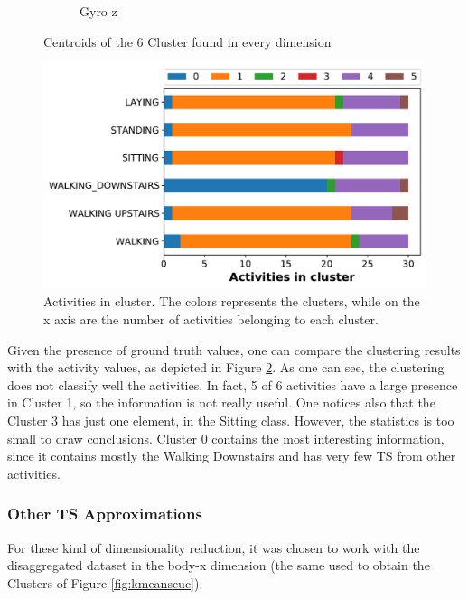 \documentclass[10pt, a4paper, twocolumn]{article}
\begin{document}
\begin{figure}
\begin{subfigure}[t]{0.3\columnwidth}
    \caption{Gyro z}
    \end{subfigure}
    
    \caption{Centroids of the 6 Cluster found in every  dimension}\label{6means6dim}
    
\end{figure}



\begin{figure}
    \centering
    \includegraphics[width=0.8\columnwidth]{histo_activity_cluster.pdf}
    \caption{Activities in cluster. The colors represents the clusters, while on the x axis are the number of activities belonging to each cluster.}
    \label{fig:actclu}
\end{figure}


Given the presence of ground truth values, one can compare the clustering results with the activity values, as depicted in Figure \ref{fig:actclu}.
As one can see, the clustering does not classify well the activities. In fact, 5 of 6 activities have a large presence in Cluster 1, so the information is not really useful. One notices also that the Cluster 3 has just one element, in the Sitting class. However, the statistics is too small to draw conclusions. Cluster 0 contains the most interesting information, since it contains mostly the Walking Downstairs and has very few TS from other activities. 

\subsubsection{Other TS Approximations}

For these kind of dimensionality reduction, it was chosen to work with the disaggregated dataset in the body-x dimension (the same used to obtain the Clusters of Figure \ref{fig:kmeanseuc}).  
\end{document}
